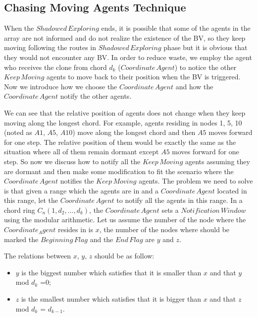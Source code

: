 \subsection{Chasing Moving Agents Technique}


When the $Shadowed\,Exploring$ ends, it is possible that some of the agents in the array are not informed and do not realize the existence of the BV, so they keep moving following the routes in $Shadowed\,Exploring$  phase but it is obvious that they would not encounter any BV. In order to reduce waste, we employ the agent who receives the clone from chord $d_k$ ($Coordinate\,Agent$) to notice the other $Keep\,Moving$ agents to move back to their position when the BV is triggered. Now we introduce how we choose the $Coordinate\,Agent$ and how the $Coordinate\,Agent$ notify the other agents.



We can see that the relative position of agents does not change when they keep moving along the longest chord. For example, agents residing in nodes 1, 5, 10 (noted as $A1$, $A5$, $A10$) move along the longest chord and then $A5$ moves forward for one step. The relative position of them would be exactly the same as the situation where all of them remain dormant except $A5$ moves forward for one step. So now we discuss how to notify all the $Keep\,Moving$ agents assuming they are dormant and then make some modification to fit the scenario where the $Coordinate\,Agent$ notifies the $Keep\,Moving$ agents. The problem we need to solve is that given a range which the agents are in and a $Coordinate\,Agent$ located in this range, let the $Coordinate\,Agent$ to notify all the agents in this range. In a chord ring $C_n(1, d_2, \ldots, d_k)$, the $Coordinate\,Agent$ sets a $Notification\,Window$ using the modular arithmetic. Let us assume the number of the node where the $Coordinate_Agent$ resides in is $x$, the number of the nodes where should be marked the $Beginning\,Flag$ and the $End\,Flag$ are $y$ and $z$. 

The relations between $x$, $y$, $z$ should be as follow: 

\begin{itemize}
\item $y$ is the biggest number which satisfies that it is smaller than $x$ and that $y$ mod $d_k$ =$0$; 
\item $z$ is the smallest number which satisfies that it is bigger than $x$ and that $z$ mod $d_k$ = $d_{k-1}$.
\end{itemize} 

